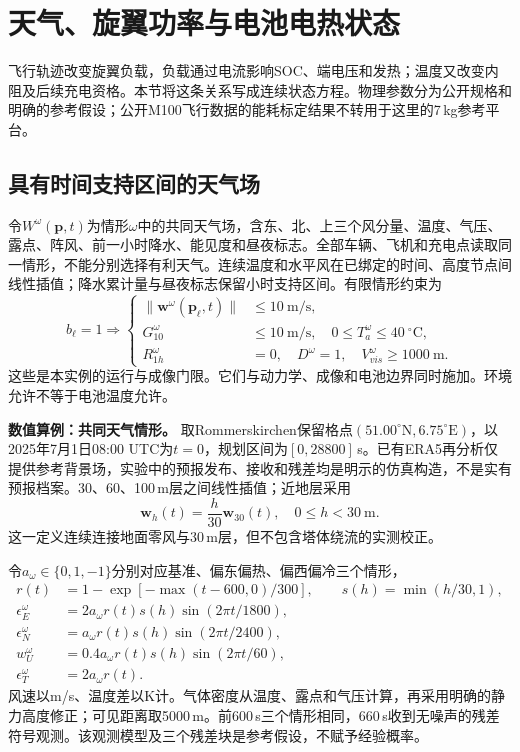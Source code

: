 \section{天气、旋翼功率与电池电热状态}
\label{sec:04_08}

飞行轨迹改变旋翼负载，负载通过电流影响SOC、端电压和发热；温度又改变内阻及后续充电资格。本节将这条关系写成连续状态方程。物理参数分为公开规格和明确的参考假设；公开M100飞行数据的能耗标定结果不转用于这里的7\,kg参考平台。

\subsection{具有时间支持区间的天气场}

令$W^\omega(\mathbf p,t)$为情形$\omega$中的共同天气场，含东、北、上三个风分量、温度、气压、露点、阵风、前一小时降水、能见度和昼夜标志。全部车辆、飞机和充电点读取同一情形，不能分别选择有利天气。连续温度和水平风在已绑定的时间、高度节点间线性插值；降水累计量与昼夜标志保留小时支持区间。有限情形约束为
\begin{equation}
 b_\ell=1\Rightarrow
 \left\{\begin{aligned}
 \|\mathbf w^\omega(\mathbf p_\ell,t)\|&\le10\ \mathrm{m/s},\\
 G_{10}^\omega&\le10\ \mathrm{m/s},\quad 0\le T_a^\omega\le40\ ^\circ\mathrm C,\\
 R_{1h}^\omega&=0,\quad D^\omega=1,\quad V_{vis}^\omega\ge1000\ \mathrm m.
 \end{aligned}\right.
 \label{s0408:flight_weather_constraints}
\end{equation}
这些是本实例的运行与成像门限。它们与动力学、成像和电池边界同时施加。环境允许不等于电池温度允许。

\textbf{数值算例：共同天气情形。} 取Rommerskirchen保留格点$(51.00^\circ\mathrm N,6.75^\circ\mathrm E)$，以2025年7月1日08:00 UTC为$t=0$，规划区间为$[0,28800]$\,s。已有ERA5再分析仅提供参考背景场，实验中的预报发布、接收和残差均是明示的仿真构造，不是实有预报档案\cite{OpenMeteoHistory,OpenMeteoRuns}。30、60、100\,m层之间线性插值；近地层采用
\begin{equation}
 \mathbf w_h(t)=\frac h{30}\mathbf w_{30}(t),\quad0\le h<30\ \mathrm m.
 \label{s0408:ground_wind}
\end{equation}
这一定义连续连接地面零风与30\,m层，但不包含塔体绕流的实测校正。

令$a_\omega\in\{0,1,-1\}$分别对应基准、偏东偏热、偏西偏冷三个情形，
\begin{align}
 r(t)&=1-\exp[-\max(t-600,0)/300],\qquad s(h)=\min(h/30,1),\\
 \epsilon_E^\omega&=2a_\omega r(t)s(h)\sin(2\pi t/1800),\\
 \epsilon_N^\omega&=a_\omega r(t)s(h)\sin(2\pi t/2400),\\
 w_U^\omega&=0.4a_\omega r(t)s(h)\sin(2\pi t/60),\\
 \epsilon_T^\omega&=2a_\omega r(t).
 \label{s0408:numeric_weather}
\end{align}
风速以m/s、温度差以K计。气体密度从温度、露点和气压计算，再采用明确的静力高度修正；可见距离取5000\,m。前600\,s三个情形相同，660\,s收到无噪声的残差符号观测。该观测模型及三个残差块是参考假设，不赋予经验概率。


